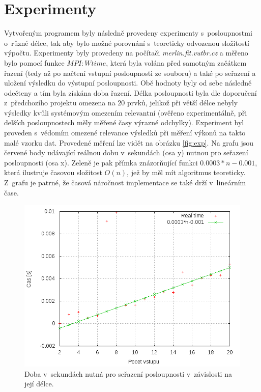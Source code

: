 \documentclass[a4paper, 12pt]{article}
\begin{document}
\section{Experimenty}
\label{sec:exprmts}
Vytvořeným programem byly následně provedeny experimenty s~posloupnostmi o~různé délce, tak aby bylo
možné porovnání s~teoreticky odvozenou složitostí výpočtu.
Experimenty byly provedeny na počítači \emph{merlin.fit.vutbr.cz} a měřeno bylo pomocí
funkce $MPI:Wtime$, která byla volána před samotným začátkem řazení (tedy až po načtení vstupní posloupnosti ze souboru)
a také po seřazení a uložení výsledku do výstupní posloupnosti.
Obě hodnoty byly od sebe následně odečteny a tím byla získána doba řazení.
Délka posloupnosti byla dle doporučení z~předchozího projektu omezena na $20$ prvků, jelikož při
větší délce nebyly výsledky kvůli systémovým omezením relevantní (ověřeno experimentálně, při delších
posloupnostech měly měřené časy výrazné odchylky).
Experiment byl proveden s~vědomím omezené relevance výsledků při měření výkonů na takto malé vzorku dat.
Provedené měření lze vidět na obrázku \ref{fig:exp}.
Na grafu jsou červené body udávající reálnou dobu v~sekundách (osa y) nutnou pro seřazení
posloupnosti (osa x).
Zeleně je pak přímka znázorňující funkci $0.0003*n-0.001$, která ilustruje
časovou složitost $O(n)$, jež by měl mít algoritmus teoreticky.
Z~grafu je patrné, že časová náročnost implementace se také drží v~lineárním čase.

\begin{figure}
\includegraphics[width=15cm,keepaspectratio]{plots/perf.png}
\caption{Doba v~sekundách nutná pro seřazení posloupnosti v~závislosti na její délce.}
\end{figure}
\label{fig:exp}
\end{document}
